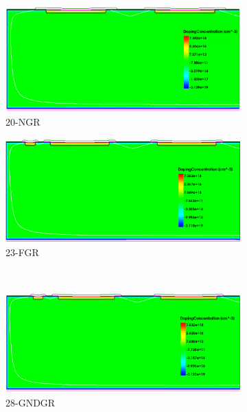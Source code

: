 \begin{figure}[htbp]
  \centering
  \begin{subfigure}[b]{0.5\linewidth}
    \includegraphics[width=\textwidth]{figures/TCAD/dopingConcentration_NoGR.png}
    \caption{20-NGR}
  \end{subfigure}\hfill
  \begin{subfigure}[b]{0.5\linewidth}
    \includegraphics[width=\textwidth]{figures/TCAD/dopingConcentration_FloatGR.png}
    \caption{23-FGR}
  \end{subfigure} \\
  \begin{subfigure}[b]{0.5\linewidth}
    \includegraphics[width=\textwidth]{figures/TCAD/dopingConcentration_28_GNDGR.png}
    \caption{28-GNDGR}
  \end{subfigure}\hfill
  \begin{subfigure}[b]{0.5\linewidth}

\end{subfigure}
\end{figure}
